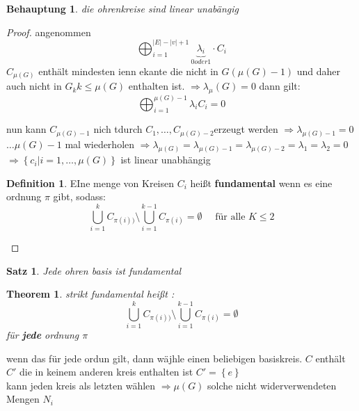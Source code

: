 \documentclass[a4paper]{article}
\newtheorem{theorem}{Theorem}[section]
\newtheorem{satz}{Satz}
\newtheorem{behauptung}{Behauptung}
\theoremstyle{definition}
\newtheorem{definition}{Definition}
\theoremstyle{remark}
\begin{document}
\begin{behauptung}
  die ohrenkreise sind linear unabängig	

\end{behauptung}
\begin{proof}
  angenommen 
  \begin{equation*}
    \bigoplus_{i=1}^{|E|-|v|+1}
    \underbrace{\lambda _i}_{0 oder 1}\cdot C_i
  \end{equation*}
  $C_{\mu(G)}$ enthält mindesten ienn ekante die nicht in $G(\mu(G)-1)$ und daher auch nicht in $G_k k\leq \mu(G)$ enthalten ist.
  $\Rightarrow \lambda _\mu(G)=0$
  dann gilt:
  \begin{equation*} 
    \bigoplus_{i=1}^{\mu(G)-1}\lambda _iC_i=0
  \end{equation*}



  nun kann $C_{\mu(G)-1}$ nich tdurch $C_1,\dots, C_{\mu(G)-2}$erzeugt werden 
  $\Rightarrow \lambda_{\mu(G)-1}= 0$\\
  $\dots \mu(G)-1$ mal wiederholen
  $\Rightarrow \lambda _{\mu(G)}= \lambda_{\mu(G)-1}= \lambda _{\mu(G)-2}=\lambda _1=\lambda _2=0$\\
  $\Rightarrow \left\{ c_i|i=1,\dots,\mu(G) \right\}$ ist linear unabhängig
  \begin{definition}
    EIne menge von Kreisen $C_i$ heißt \textbf{fundamental} wenn es eine ordnung $\pi$ gibt, sodass:
    \begin{equation*}
    \bigcup_{i=1}^{k}C_{\pi(i))}   \setminus   \bigcup _{i=1}^{k-1} C_{\pi(i)}= \emptyset \quad \textrm{ für alle }  K\leq 2 
    \end{equation*}
  \end{definition}
\end{proof}
\begin{satz}
  Jede ohren basis ist fundamental
\end{satz}
\begin{theorem}
  strikt fundamental heißt :
  \begin{equation*}
    \bigcup_{i=1}^{k}C_{\pi(i))}   \setminus   \bigcup _{i=1}^{k-1} C_{\pi(i)}= \emptyset
  \end{equation*}
  für \textbf{jede} ordnung $\pi$
\end{theorem}
wenn das für jede ordun gilt, dann wäjhle einen beliebigen basiskreis. $C$ enthält $C'$ die in keinem anderen kreis enthalten ist  $C'=\left\{ e \right\}$\\
kann jeden kreis als letzten wählen 
$\Rightarrow \mu(G)$ solche nicht widerverwendeten Mengen $N_i$
\end{document}

